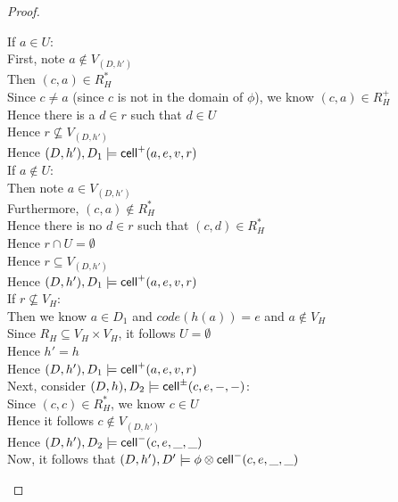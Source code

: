 \begin{proof}
\begin{tabbedproof}
\ooooo If $a \in U$: \\
\oooooo First, note $a \not\in V_{(D,h')}$ \\
\oooooo Then $(c, a) \in R^*_H$ \\
\oooooo Since $c \not= a$ (since $c$ is not in the domain of $\phi$), we know $(c,a) \in R^+_H$ \\
\oooooo Hence there is a $d \in r$ such that $d \in U$ \\
\oooooo Hence $r \not\subseteq V_{(D, h')}$ \\
\oooooo Hence $(D,h'), D_1 \models \mathsf{cell}^{+}({a}, {e}, {v}, {r})$ \\
\ooooo If $a \not\in U$: \\
\oooooo Then note $a \in V_{(D,h')}$ \\
\oooooo Furthermore, $(c, a) \not\in R^*_H$ \\
\oooooo Hence there is no $d \in r$ such that $(c, d) \in R^*_H$  \\
\oooooo Hence $r \cap U = \emptyset$ \\
\oooooo Hence $r \subseteq V_{(D,h')}$ \\
\oooooo Hence $(D,h'), D_1 \models \mathsf{cell}^{+}({a}, {e}, {v}, {r})$ \\
\oooo If $r \not\subseteq V_H$: \\
\ooooo Then we know $a \in D_1$ and $\mathit{code}(h(a)) = e$ and $a \not\in V_H$ \\
\ooooo Since $R_H \subseteq V_H \times V_H$, it follows  $U = \emptyset$ \\
\ooooo Hence $h' = h$ \\
\ooooo Hence $(D,h'), D_1 \models \mathsf{cell}^{+}({a}, {e}, {v}, {r})$ \\
\oo Next, consider $(D,h), D_2 \models \mathsf{cell}^{\pm}({c}, {e}, {-}, {-})$: \\
\ooo Since $(c, c) \in R^*_H$,  we know $c \in U$ \\
\ooo Hence it follows $c \not\in V_{(D, h')}$ \\
\ooo Hence $(D,h'), D_2 \models \mathsf{cell}^{-}({c}, {e}, {\_}, {\_})$ \\
\oo Now, it follows that $(D,h'), D' \models \phi \otimes \mathsf{cell}^{-}({c}, {e}, {\_}, {\_})$ \\ 
\end{tabbedproof}
\end{proof}


